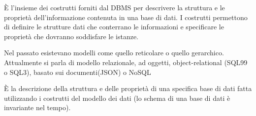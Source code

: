 \documentclass[a4paper, 12pt]{book}
\begin{document}
    



    \vspace{15pt}

    \begin{tcolorbox}[
      colback=cyan!5!white,
      colframe=blue!50!black,
      title=\textbf{Definizione - DBMS: modello dei dati},
      coltitle=white,
      fonttitle=\bfseries,
      arc=3mm,
      boxrule=0.5pt,
      enhanced,
      breakable
    ]
    È l’insieme dei costrutti forniti dal DBMS per descrivere la struttura e le proprietà dell’informazione contenuta in una base di dati.
    I costrutti permettono di definire le strutture dati che conterrano le informazioni e specificare le proprietà che dovranno soddisfare le istanze.

    \end{tcolorbox}

    \vspace{15pt}



     Nel passato esistevano modelli come quello reticolare o quello gerarchico. \\
     Attualmente si parla di modello relazionale, ad oggetti, object-relational (SQL99 o SQL3), basato sui documenti(JSON) o NoSQL



    \vspace{15pt}

    \begin{tcolorbox}[
      colback=cyan!5!white,
      colframe=blue!50!black,
      title=\textbf{Definizione - Schema di una base di dati},
      coltitle=white,
      fonttitle=\bfseries,
      arc=3mm,
      boxrule=0.5pt,
      enhanced,
      breakable
    ]
    È la descrizione della struttura e delle proprietà di una specifica base di dati fatta utilizzando i costrutti del modello dei dati (lo schema di una base di dati è invariante nel tempo).

    \end{tcolorbox}

    \vspace{15pt}


\end{document}
